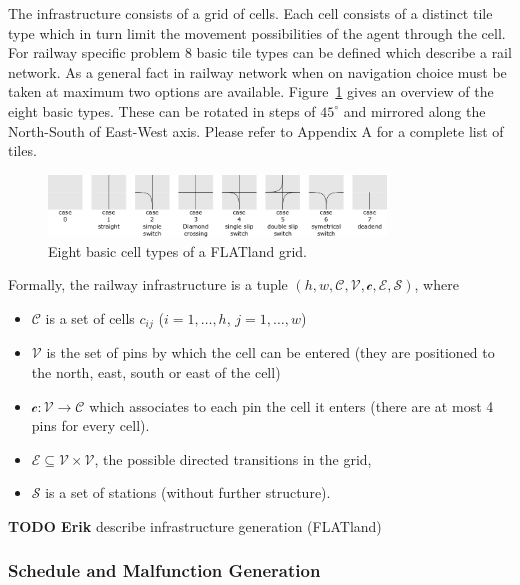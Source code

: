 \documentclass{article}
\begin{document}
The infrastructure consists of a grid of cells. Each cell consists of a distinct tile type which in turn limit the movement possibilities of the agent through the cell. For railway specific problem 8 basic tile types can be defined which describe a rail network. As a general fact in railway network when on navigation choice must be taken at maximum two options are available.
%
Figure~\ref{fig:H1_railway_elements} gives an overview of the eight basic types. These can be rotated in steps of $45^\circ$ and mirrored along the North-South of East-West axis. Please refer to Appendix A for a complete list of tiles.
%
\begin{figure}[hbtp]
	\centering
  \includegraphics[width=0.8\textwidth]{H1_railway_elements.png}
	\caption{Eight basic cell types of a FLATland grid.}
	\label{fig:H1_railway_elements}
\end{figure}
%
Formally, the railway infrastructure is a tuple  $(h,w,\mathcal{C}, \mathcal{V}, \mathscr{c}, \mathcal{E}, \mathcal{S})$, where
\begin{itemize}
    \item $\mathcal{C}$ is a set of cells $c_{ij}$ ($i=1,\ldots,h$, $j=1,\ldots,w$)
    \item $\mathcal{V}$ is the set of pins by which the cell can be entered (they are positioned to the north, east, south or east of the cell)
    \item $\mathscr{c}: \mathcal{V} \to \mathcal{C}$ which associates to each pin the cell it enters (there are at most 4 pins for every cell).
    \item $\mathcal{E} \subseteq \mathcal{V} \times \mathcal{V}$, the possible directed transitions in the grid,
    \item $\mathcal{S}$ is a set of stations (without further structure).
\end{itemize}



\begin{mdframed}
{\bf TODO Erik} describe infrastructure generation (FLATland)
\end{mdframed}


\subsubsection{Schedule and Malfunction Generation}\label{subsubsec:scheduleandmalfunctiongeneration}
\end{document}
